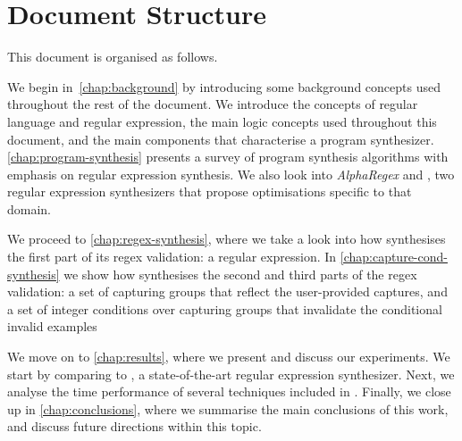 \section{Document Structure}

This document is organised as follows.

We begin in~\autoref{chap:background} by introducing some background concepts used throughout the rest of the document. We introduce the concepts of regular language and regular expression, the main logic concepts used throughout this document, and the main components that characterise a program synthesizer.
%
\autoref{chap:program-synthesis} presents a survey of program synthesis algorithms with emphasis on regular expression synthesis.
%
We also look into \textit{AlphaRegex} and \Regel, two regular expression synthesizers that propose optimisations specific to that domain.

We proceed to \autoref{chap:regex-synthesis}, where we take a look into how \Forest synthesises the first part of its regex validation: a regular expression.
%
In \autoref{chap:capture-cond-synthesis} we show how \Forest synthesises the second and third parts of the regex validation: a set of capturing groups that reflect the user-provided captures, and a set of integer conditions over capturing groups that invalidate the conditional invalid examples

We move on to \autoref{chap:results}, where we present and discuss our experiments. We start by comparing \Forest to \Regel, a state-of-the-art regular expression synthesizer. Next, we analyse the time performance of several techniques included in \Forest.
%
Finally, we close up in \autoref{chap:conclusions}, where we summarise the main conclusions of this work, and discuss future directions within this topic.

